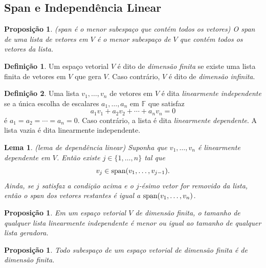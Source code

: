 \documentclass[12pt]{article}
\theoremstyle{plain}
\newtheorem{prop}[thm]{Proposição}
\newtheorem{lem}[thm]{Lema}
\theoremstyle{definition}
\newtheorem{defn}{Definição}[section]
\theoremstyle{remark}
\begin{document}
\subsection{Span e Independência Linear}
\begin{prop} (span é o menor subespaço que contém todos os vetores)
    O span de uma lista de vetores em \(V\) é o menor subespaço de \(V\) que contém todos os vetores da lista.
\end{prop}

\begin{defn}
    Um espaço vetorial \(V\) é dito de \emph{dimensão finita} se existe uma lista finita de vetores em \(V\) que gera \(V\). Caso contrário, \(V\) é dito de \emph{dimensão infinita}.
\end{defn}

\begin{defn}
    Uma lista \(v_1, \ldots, v_n\) de vetores em \(V\) é dita \emph{linearmente independente} se a única escolha de escalares \(a_1, \ldots, a_n\) em \(\mathbb{F}\) que satisfaz
    \begin{equation}
        a_1 v_1 + a_2 v_2 + \cdots + a_n v_n = 0
    \end{equation}
    \noindent é \(a_1 = a_2 = \cdots = a_n = 0\). Caso contrário, a lista é dita \emph{linearmente dependente}. A lista vazia é dita linearmente independente.
\end{defn}

\begin{lem} (lema de dependência linear)
    Suponha que \(v_1, \ldots, v_n\) é linearmente dependente em \(V\). Então existe \(j \in \{1, \ldots, n\}\) tal que
    \begin{equation}
        v_j \in \textup{span}(v_1, \ldots, v_{j-1}).
    \end{equation}
    \noindent Ainda, se \(j\) satisfaz a condição acima e o \(j\)-ésimo vetor for removido da lista, então o span dos vetores restantes é igual a \(\textup{span}(v_1, \ldots, v_n)\).
\end{lem}

\begin{prop}
    Em um espaço vetorial \(V\) de dimensão finita, o tamanho de qualquer lista linearmente independente é menor ou igual ao tamanho de qualquer lista geradora.
\end{prop}

\begin{prop}
    Todo subespaço de um espaço vetorial de dimensão finita é de dimensão finita.
\end{prop}
\end{document}
